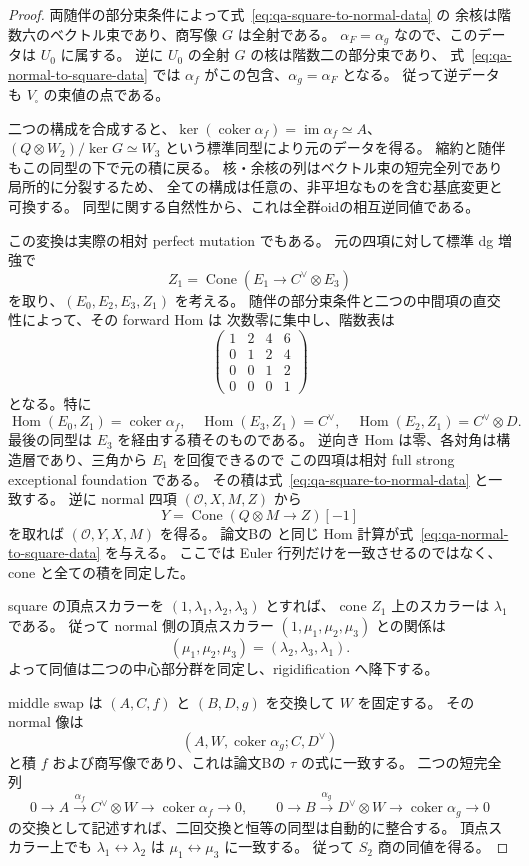 \begin{proof}
両随伴の部分束条件によって式~\eqref{eq:qa-square-to-normal-data} の
余核は階数六のベクトル束であり、商写像 $G$ は全射である。
$\alpha_F=\alpha_g$ なので、このデータは $U_0$ に属する。
逆に $U_0$ の全射 $G$ の核は階数二の部分束であり、
式~\eqref{eq:qa-normal-to-square-data} では
$\alpha_f$ がこの包含、$\alpha_g=\alpha_F$ となる。
従って逆データも $V_\square$ の束値の点である。

二つの構成を合成すると、$\ker(\operatorname{coker}\alpha_f)
=\operatorname{im}\alpha_f\simeq A$、
$(Q\otimes W_2)/\ker G\simeq W_3$ という標準同型により元のデータを得る。
縮約と随伴もこの同型の下で元の積に戻る。
核・余核の列はベクトル束の短完全列であり局所的に分裂するため、
全ての構成は任意の、非平坦なものを含む基底変更と可換する。
同型に関する自然性から、これは全群oidの相互逆同値である。

この変換は実際の相対 perfect mutation でもある。
元の四項に対して標準 dg 増強で
\[
 Z_1=\operatorname{Cone}(E_1\longrightarrow C^\vee\otimes E_3)
\]
を取り、$(E_0,E_2,E_3,Z_1)$ を考える。
随伴の部分束条件と二つの中間項の直交性によって、その forward Hom は
次数零に集中し、階数表は
\[
 \begin{pmatrix}1&2&4&6\\0&1&2&4\\0&0&1&2\\0&0&0&1\end{pmatrix}
\]
となる。特に
\[
 \operatorname{Hom}(E_0,Z_1)=\operatorname{coker}\alpha_f,
 \quad\operatorname{Hom}(E_3,Z_1)=C^\vee,
 \quad\operatorname{Hom}(E_2,Z_1)=C^\vee\otimes D.
\]
最後の同型は $E_3$ を経由する積そのものである。
逆向き Hom は零、各対角は構造層であり、三角から $E_1$ を回復できるので
この四項は相対 full strong exceptional foundation である。
その積は式~\eqref{eq:qa-square-to-normal-data} と一致する。
逆に normal 四項 $(\mathcal O,X,M,Z)$ から
\[
 Y=\operatorname{Cone}(Q\otimes M\longrightarrow Z)[-1]
\]
を取れば $(\mathcal O,Y,X,M)$ を得る。
論文Bの\cite[\texttt{prop:ruling-involution-mutation}]{QuadricModuli2026}
と同じ Hom 計算が式~\eqref{eq:qa-normal-to-square-data} を与える。
ここでは Euler 行列だけを一致させるのではなく、cone と全ての積を同定した。

square の頂点スカラーを $(1,\lambda_1,\lambda_2,\lambda_3)$ とすれば、
cone $Z_1$ 上のスカラーは $\lambda_1$ である。
従って normal 側の頂点スカラー $(1,\mu_1,\mu_2,\mu_3)$ との関係は
\[
 (\mu_1,\mu_2,\mu_3)=(\lambda_2,\lambda_3,\lambda_1).
\]
よって同値は二つの中心部分群を同定し、rigidification へ降下する。

middle swap は $(A,C,f)$ と $(B,D,g)$ を交換して $W$ を固定する。
その normal 像は
\[
 (A,W,\operatorname{coker}\alpha_g;C,D^\vee)
\]
と積 $f$ および商写像であり、これは論文Bの $\tau$ の式に一致する。
二つの短完全列
\[
 0\to A\xrightarrow{\alpha_f}C^\vee\otimes W
          \to\operatorname{coker}\alpha_f\to0,\qquad
 0\to B\xrightarrow{\alpha_g}D^\vee\otimes W
          \to\operatorname{coker}\alpha_g\to0
\]
の交換として記述すれば、二回交換と恒等の同型は自動的に整合する。
頂点スカラー上でも $\lambda_1\leftrightarrow\lambda_2$ は
$\mu_1\leftrightarrow\mu_3$ に一致する。
従って $S_2$ 商の同値を得る。
\end{proof}

